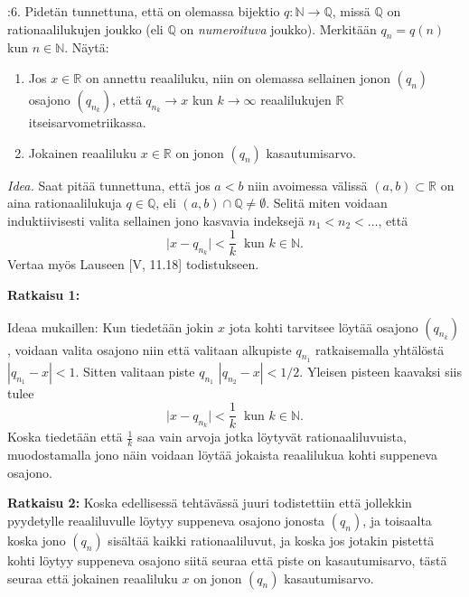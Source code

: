 \documentclass[12pt,a4paper,leqno]{amsart}
\begin{document}
\bigskip

:6.   Pidetän tunnettuna, että on 
olemassa bijektio $q: \mathbb N \to \mathbb Q$,
missä $\mathbb Q$ on rationaalilukujen joukko 
(eli $\mathbb Q$ on \textit{numeroituva} joukko). Merkitään 
$q_n = q(n)$ kun $n \in \mathbb N$. Näytä: 

\begin{enumerate}
\item Jos $x \in \mathbb R$ on annettu reaaliluku, niin on olemassa sellainen jonon $(q_n)$
osajono $(q_{n_{k}})$, että
$q_{n_{k}} \to x$ kun $k \to \infty$ reaalilukujen $\mathbb R$ itseisarvometriikassa.

\smallskip

\item Jokainen reaaliluku $x \in \mathbb R$ on  jonon $(q_n)$ kasautumisarvo.
\end{enumerate}
\smallskip

\noindent \textit{Idea.} Saat pitää tunnettuna, että jos $a < b$ niin avoimessa välissä 
$(a,b) \subset \mathbb R$ on aina rationaalilukuja $q \in \mathbb Q$, 
eli $(a,b) \cap \mathbb Q \neq \emptyset$. 
Selitä miten voidaan  induktiivisesti  valita sellainen jono kasvavia indeksejä 
$n_1 < n_2 < \ldots$, että  
\[
\vert x - q_{n_{k}}\vert < \frac{1}{k}  \  \textrm{ kun } k \in \mathbb N.
\]
Vertaa myös Lauseen  [V, 11.18] todistukseen.

\textbf{Ratkaisu 1:}

Ideaa mukaillen: Kun tiedetään jokin $x$ jota kohti tarvitsee löytää osajono $(q_{n_k})$, voidaan valita osajono niin että valitaan alkupiste $q_{n_1}$ ratkaisemalla yhtälöstä $|q_{n_1} - x| < 1$. Sitten valitaan piste $q_{n_1}$ $|q_{n_2} - x| < 1/2$. Yleisen pisteen kaavaksi siis tulee  \[
\vert x - q_{n_{k}}\vert < \frac{1}{k}  \  \textrm{ kun } k \in \mathbb N.
\]
Koska tiedetään että $\frac{1}{k}$ saa vain arvoja jotka löytyvät rationaaliluvuista, muodostamalla jono näin voidaan löytää jokaista reaalilukua kohti suppeneva osajono.

\textbf{Ratkaisu 2: }
Koska edellisessä tehtävässä juuri todistettiin että jollekkin pyydetylle reaaliluvulle löytyy suppeneva osajono jonosta $(q_n)$, ja toisaalta koska jono $(q_n)$ sisältää kaikki rationaaliluvut, ja koska jos jotakin pistettä kohti löytyy suppeneva osajono siitä seuraa että piste on kasautumisarvo, tästä seuraa että jokainen reaaliluku $x$ on jonon $(q_n)$ kasautumisarvo.
\end{document}
